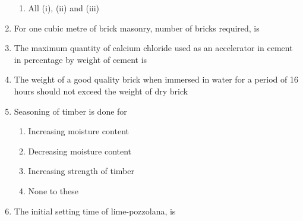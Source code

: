\documentclass[11pt,a4paper]{article}
\begin{document}
\begin{enumerate}
\begin{enumerate}[label=\Alph*.]
\item{All (i), (ii) and (iii)}
\end{enumerate}
\item{For one cubic metre of brick masonry, number of bricks required, is}
\\
\item{The maximum quantity of calcium chloride used as an accelerator in cement in percentage by weight of cement is}
\\
\item{The weight of a good quality brick when immersed in water for a period of 16 hours should not exceed the weight of dry brick}
\\
\item{Seasoning of timber is done for}
\begin{enumerate}[label=\Alph*.]
\item{Increasing moisture content}
\item{Decreasing moisture content}
\item{Increasing strength of timber}
\item{None to these}
\end{enumerate}
\item{The initial setting time of lime-pozzolana, is}
\\
\end{enumerate}
\end{document}

